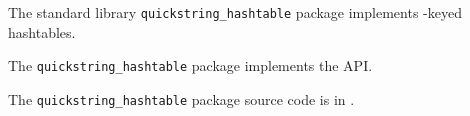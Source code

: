 
The standard library {\tt quickstring\_hashtable} package implements 
-keyed hashtables.

The {\tt quickstring\_hashtable} package implements the  API.

The {\tt quickstring\_hashtable} package source code is in .


